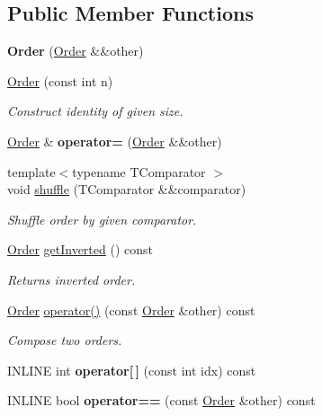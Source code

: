 \subsection*{Public Member Functions}
\begin{DoxyCompactItemize}
\item 
\hypertarget{classOrder_ae188d30917a4f10444d428e6bfafe8ac}{}\label{classOrder_ae188d30917a4f10444d428e6bfafe8ac} 
{\bfseries Order} (\hyperlink{classOrder}{Order} \&\&other)
\item 
\hypertarget{classOrder_a07e33dd146779382d4f7321e1ae4d505}{}\label{classOrder_a07e33dd146779382d4f7321e1ae4d505} 
\hyperlink{classOrder_a07e33dd146779382d4f7321e1ae4d505}{Order} (const int n)
\begin{DoxyCompactList}\small\item\em Construct identity of given size. \end{DoxyCompactList}\item 
\hypertarget{classOrder_ab6b1af85c1a2f67023b46bae2beaacf9}{}\label{classOrder_ab6b1af85c1a2f67023b46bae2beaacf9} 
\hyperlink{classOrder}{Order} \& {\bfseries operator=} (\hyperlink{classOrder}{Order} \&\&other)
\item 
\hypertarget{classOrder_a337740020faa60244d7103d839465014}{}\label{classOrder_a337740020faa60244d7103d839465014} 
{\footnotesize template$<$typename T\+Comparator $>$ }\\void \hyperlink{classOrder_a337740020faa60244d7103d839465014}{shuffle} (T\+Comparator \&\&comparator)
\begin{DoxyCompactList}\small\item\em Shuffle order by given comparator. \end{DoxyCompactList}\item 
\hypertarget{classOrder_abfb5b149c5993d6a99c50a847fe92414}{}\label{classOrder_abfb5b149c5993d6a99c50a847fe92414} 
\hyperlink{classOrder}{Order} \hyperlink{classOrder_abfb5b149c5993d6a99c50a847fe92414}{get\+Inverted} () const
\begin{DoxyCompactList}\small\item\em Returns inverted order. \end{DoxyCompactList}\item 
\hypertarget{classOrder_ad5c943d3d8f6aafe3f8a0e0489b9a039}{}\label{classOrder_ad5c943d3d8f6aafe3f8a0e0489b9a039} 
\hyperlink{classOrder}{Order} \hyperlink{classOrder_ad5c943d3d8f6aafe3f8a0e0489b9a039}{operator()} (const \hyperlink{classOrder}{Order} \&other) const
\begin{DoxyCompactList}\small\item\em Compose two orders. \end{DoxyCompactList}\item 
\hypertarget{classOrder_a2c1ba475a03c4429d996361c2e02690f}{}\label{classOrder_a2c1ba475a03c4429d996361c2e02690f} 
I\+N\+L\+I\+NE int {\bfseries operator\mbox{[}$\,$\mbox{]}} (const int idx) const
\item 
\hypertarget{classOrder_a3a1b73d68ad74b75e18a57aaccc060cc}{}\label{classOrder_a3a1b73d68ad74b75e18a57aaccc060cc} 
I\+N\+L\+I\+NE bool {\bfseries operator==} (const \hyperlink{classOrder}{Order} \&other) const
\end{DoxyCompactItemize}


